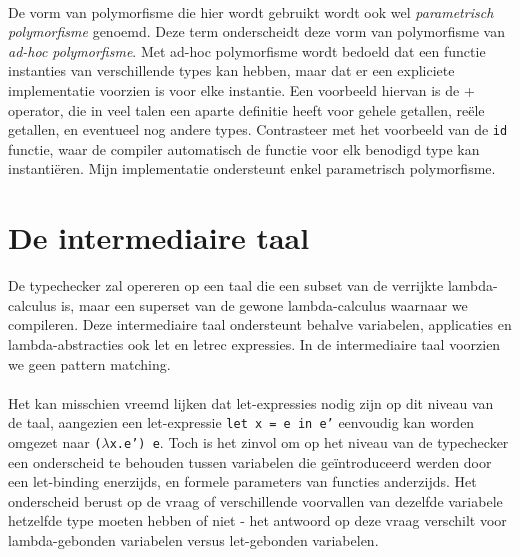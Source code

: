 \documentclass[a4paper,10pt]{article}
\begin{document}
\paragraph{}
De vorm van polymorfisme die hier wordt gebruikt wordt ook wel \emph{parametrisch polymorfisme} genoemd.
Deze term onderscheidt deze vorm van polymorfisme van \emph{ad-hoc polymorfisme}.
Met ad-hoc polymorfisme wordt bedoeld dat een functie instanties van verschillende types kan hebben, maar dat er een expliciete implementatie voorzien is voor elke instantie.
Een voorbeeld hiervan is de + operator, die in veel talen een aparte definitie heeft voor gehele getallen, re{\"e}le getallen, en eventueel nog andere types.
Contrasteer met het voorbeeld van de \texttt{id} functie, waar de compiler automatisch de functie voor elk benodigd type kan instanti{\"e}ren.
Mijn implementatie ondersteunt enkel parametrisch polymorfisme.

\section{De intermediaire taal}
De typechecker zal opereren op een taal die een subset van de verrijkte lambda-calculus is, maar een superset van de gewone lambda-calculus waarnaar we compileren.
Deze intermediaire taal ondersteunt behalve variabelen, applicaties en lambda-abstracties ook let en letrec expressies.
In de intermediaire taal voorzien we geen pattern matching.
\paragraph{}
Het kan misschien vreemd lijken dat let-expressies nodig zijn op dit niveau van de taal, aangezien een let-expressie \texttt{let x = e in e'} eenvoudig kan worden omgezet naar \texttt{($\lambda$x.e') e}.
Toch is het zinvol om op het niveau van de typechecker een onderscheid te behouden tussen variabelen die ge{\"i}ntroduceerd werden door een let-binding enerzijds, en formele parameters van functies anderzijds.
Het onderscheid berust op de vraag of verschillende voorvallen van dezelfde variabele hetzelfde type moeten hebben of niet - het antwoord op deze vraag verschilt voor lambda-gebonden variabelen versus let-gebonden variabelen.
\end{document}
